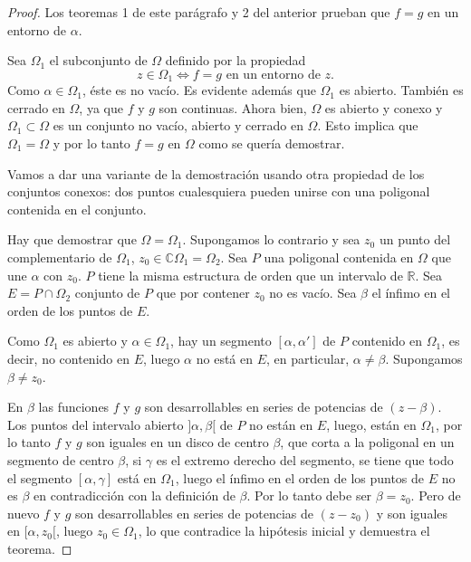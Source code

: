 \documentclass[10pt]{article}
\theoremstyle{plain}
\theoremstyle{definition}
\theoremstyle{remark}
\begin{document}
\begin{proof}
Los teoremas 1 de este parágrafo y 2 del anterior prueban que $f=g$ en un entorno de $\alpha$.

Sea $\Omega_{1}$ el subconjunto de $\Omega$ definido por la propiedad
$$z \in \Omega_{1} \Longleftrightarrow f=g \text{ en un entorno de } z.$$
Como $\alpha \in \Omega_{1}$, éste es no vacío. Es evidente además que $\Omega_{1}$ es abierto.
También es cerrado en $\Omega$, ya que $f$ y $g$ son continuas.
Ahora bien, $\Omega$ es abierto y conexo y $\Omega_{1} \subset \Omega$ es un conjunto no vacío, abierto y cerrado en $\Omega$. Esto implica que $\Omega_{1}=\Omega$ y por lo tanto $f=g$ en $\Omega$ como se quería demostrar.

Vamos a dar una variante de la demostración usando otra propiedad de los conjuntos conexos: dos puntos cualesquiera pueden unirse con una poligonal contenida en el conjunto.

Hay que demostrar que $\Omega=\Omega_{1}$. Supongamos lo contrario y sea $z_{0}$ un punto del complementario de $\Omega_{1}$, $z_{0} \in \mathbb{C}\Omega_{1}=\Omega_{2}$. Sea $P$ una poligonal contenida en $\Omega$ que une $\alpha$ con $z_{0}$. $P$ tiene la misma estructura de orden que un intervalo de $\mathbb{R}$. Sea $E=P \cap \Omega_{2}$ conjunto de $P$ que por contener $z_{0}$ no es vacío. Sea $\beta$ el ínfimo en el orden de los puntos de $E$.

Como $\Omega_{1}$ es abierto y $\alpha \in \Omega_{1}$, hay un segmento $[\alpha, \alpha']$ de $P$ contenido en $\Omega_{1}$, es decir, no contenido en $E$, luego $\alpha$ no está en $E$, en particular, $\alpha \neq \beta$. Supongamos $\beta \neq z_{0}$.

En $\beta$ las funciones $f$ y $g$ son desarrollables en series de potencias de $(z-\beta)$. Los puntos del intervalo abierto $]\alpha, \beta[$ de $P$ no están en $E$, luego, están en $\Omega_{1}$, por lo tanto $f$ y $g$ son iguales en un disco de centro $\beta$, que corta a la poligonal en un segmento de centro $\beta$, si $\gamma$ es el extremo derecho del segmento, se tiene que todo el segmento $[\alpha, \gamma]$ está en $\Omega_{1}$, luego el ínfimo en el orden de los puntos de $E$ no es $\beta$ en contradicción con la definición de $\beta$. Por lo tanto debe ser $\beta=z_{0}$. Pero de nuevo $f$ y $g$ son desarrollables en series de potencias de $(z-z_{0})$ y son iguales en $[\alpha, z_{0}[$, luego $z_{0} \in \Omega_{1}$, lo que contradice la hipótesis inicial y demuestra el teorema.
\end{proof}
\end{document}
